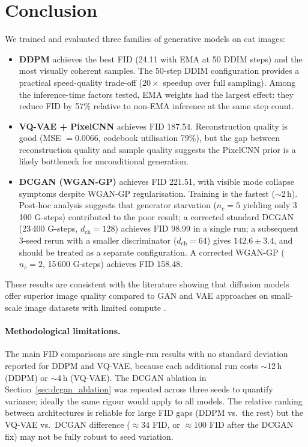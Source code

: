 \documentclass[12pt,a4paper]{article}
\begin{document}
\section{Conclusion}
\label{sec:conclusion}

We trained and evaluated three families of generative models on cat images:

\begin{itemize}[noitemsep]
  \item \textbf{DDPM} achieves the best FID (24.11 with EMA at 50 DDIM steps)
        and the most visually coherent samples.  The 50-step DDIM configuration
        provides a practical speed-quality trade-off ($20\times$ speedup over
        full sampling).  Among the inference-time factors tested, EMA weights
        had the largest effect: they reduce FID by 57\% relative to non-EMA
        inference at the same step count.
  \item \textbf{VQ-VAE + PixelCNN} achieves FID 187.54.  Reconstruction
        quality is good (MSE $= 0.0066$, codebook utilisation 79\%), but the gap
        between reconstruction quality and sample quality suggests the PixelCNN
        prior is a likely bottleneck for unconditional generation.
  \item \textbf{DCGAN (WGAN-GP)} achieves FID 221.51, with visible mode
        collapse symptoms despite WGAN-GP regularisation.  Training is the
        fastest ($\sim$2\,h).  Post-hoc analysis suggests that generator
        starvation ($n_c=5$ yielding only 3\,100 G-steps) contributed to the
        poor result; a corrected standard DCGAN (23\,400 G-steps, $d_\text{ch}=128$)
        achieves FID 98.99 in a single run; a subsequent 3-seed rerun with a
        smaller discriminator ($d_\text{ch}=64$) gives $142.6 \pm 3.4$, and
        should be treated as a separate configuration.  A corrected WGAN-GP
        ($n_c=2$, 15\,600 G-steps) achieves FID 158.48.
\end{itemize}

These results are consistent with the literature showing that diffusion models
offer superior image quality compared to GAN and VAE approaches on
small-scale image datasets with limited compute \cite{diffusionbeatsgan}.

\paragraph{Methodological limitations.}
The main FID comparisons are single-run results with no standard deviation
reported for DDPM and VQ-VAE, because each additional run costs $\sim$12\,h
(DDPM) or $\sim$4\,h (VQ-VAE).  The DCGAN ablation in Section~\ref{sec:dcgan_ablation}
was repeated across three seeds to quantify variance; ideally the same rigour
would apply to all models.  The relative ranking between architectures is
reliable for large FID gaps (DDPM vs.\ the rest) but the VQ-VAE vs.\ DCGAN
difference ($\approx34$ FID, or $\approx100$ FID after the DCGAN fix) may not
be fully robust to seed variation.
\end{document}

